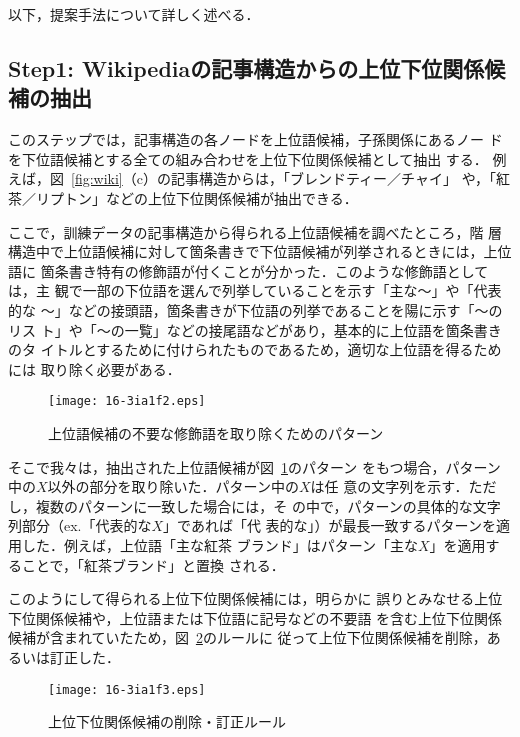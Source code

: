 \documentclass[japanese]{jnlp_1.4}
\begin{document}
以下，提案手法について詳しく述べる．



\subsection{Step1: Wikipediaの記事構造からの上位下位関係候補の抽出}

このステップでは，記事構造の各ノード{を上位語候補，}子孫関係にあるノー
ド{を下位語候補とする}全ての組み合わせを上位下位関係候補として抽出
する．
例えば，図~\ref{fig:wiki}（c）の記事構造からは，「ブレンドティー／チャイ」
や，「紅茶／リプトン」などの上位下位関係候補が抽出できる．

ここで，訓練データの記事構造から得られる上位語候補を調べたところ，階
層構造中で上位語候補に対して箇条書きで下位語候補が列挙されるときには，上位語に
箇条書き特有の修飾語が付くことが分かった．このような修飾語としては，主
観で一部の下位語を選んで列挙していることを示す「主な〜」や「代表的な
〜」などの接頭語，箇条書きが下位語の列挙であることを陽に示す「〜のリス
ト」や「〜の一覧」などの接尾語などがあり，基本的に上位語を箇条書きのタ
イトルとするために付けられたものであるため，適切な上位語を得るためには
取り除く必要がある．

\begin{figure}[b]
\begin{center}
\texttt{[image: 16-3ia1f2.eps]}
\end{center}
\caption{上位語候補の不要な修飾語を取り除くためのパターン}
\label{fig:list_pattern}
\end{figure}

そこで我々は，抽出された上位語候補が図~\ref{fig:list_pattern}のパターン
をもつ場合，パターン中の$X$以外の部分を取り除いた．パターン中の$X$は任
意の文字列を示す．{ただし，複数のパターンに一致した場合には，そ
  の中で，パターンの具体的な文字列部分（ex.「代表的な}$X${」であれば「代
  表的な」）が最長一致するパターンを適用した．}例えば，上位語「主な紅茶
ブランド」はパターン「主な$X$」を適用することで，「紅茶ブランド」と置換
される．




このようにして得られる上位下位関係候補には，明らかに
誤りとみなせる上位下位関係候補や，上位語または下位語に記号などの不要語
を含む上位下位関係候補が含まれていたため，図~\ref{fig:huyou}のルールに
従って上位下位関係候補を削除，あるいは訂正した．

\begin{figure}[t]
\begin{center}
\texttt{[image: 16-3ia1f3.eps]}
\end{center}
        \caption{上位下位関係候補の削除・訂正ルール}
        \label{fig:huyou}
\end{figure}
\end{document}
